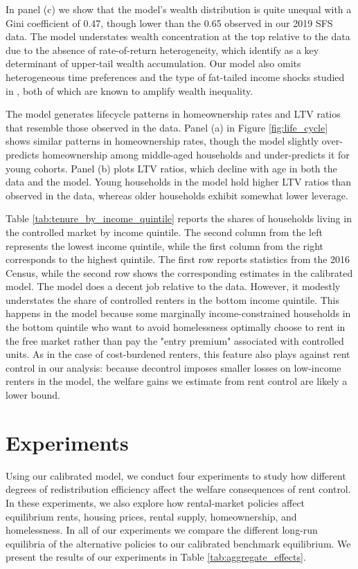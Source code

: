 \documentclass[parskip=full]{article}
\begin{document}
In panel (c) we show that the model's wealth distribution is quite unequal with a Gini coefficient of 0.47, though lower than the 0.65 observed in our 2019 SFS data. The model understates wealth concentration at the top relative to the data due to the absence of rate-of-return heterogeneity, which \citet{fagereng} identify as a key determinant of upper-tail wealth accumulation. Our model also omits heterogeneous time preferences \citep{ks-1998} and the type of fat-tailed income shocks studied in \citet{mj-shocks}, both of which are known to amplify wealth inequality.

The model generates lifecycle patterns in homeownership rates and LTV ratios that resemble those observed in the data. Panel (a) in Figure \ref{fig:life_cycle} shows similar patterns in homeownership rates, though the model slightly over-predicts homeownership among middle-aged households and under-predicts it for young cohorts. Panel (b) plots LTV ratios, which decline with age in both the data and the model. Young households in the model hold higher LTV ratios than observed in the data, whereas older households exhibit somewhat lower leverage.

Table \ref{tab:tenure_by_income_quintile} reports the shares of households living in the controlled market by income quintile. The second column from the left represents the lowest income quintile, while the first column from the right corresponds to the highest quintile. The first row reports statistics from the 2016 Census, while the second row shows the corresponding estimates in the calibrated model. The model does a decent job relative to the data. However, it modestly understates the share of controlled renters in the bottom income quintile. This happens in the model because some marginally income-constrained households in the bottom quintile who want to avoid homelessness optimally choose to rent in the free market rather than pay the "entry premium" associated with controlled units. As in the case of cost-burdened renters, this feature also plays against rent control in our analysis: because decontrol imposes smaller losses on low-income renters in the model, the welfare gains we estimate from rent control are likely a lower bound.

\section{Experiments}\label{section:experiments}

Using our calibrated model, we conduct four experiments to study how different degrees of redistribution efficiency affect the welfare consequences of rent control. In these experiments, we also explore how rental-market policies affect equilibrium rents, housing prices, rental supply, homeownership, and homelessness. In all of our experiments we compare the different long-run equilibria of the alternative policies to our calibrated benchmark equilibrium. We present the results of our experiments in Table \ref{tab:aggregate_effects}.
\end{document}
